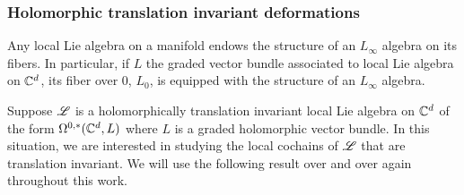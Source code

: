 \documentclass[10pt]{amsart}
\def\brian{\textcolor{blue}{BW: }\textcolor{blue}}
\begin{document}
%

\subsubsection{Holomorphic translation invariant deformations}

Any local Lie algebra on a manifold endows the structure of an $L_\infty$ algebra on its fibers. 
In particular, if $L$ the graded vector bundle associated to local Lie algebra on $\mathbb C^d$, its fiber over $0$, $L_0$, is equipped with the structure of an $L_\infty$ algebra. 

Suppose $\mathscr L$ is a holomorphically translation invariant local Lie algebra on $\mathbb C^d$ of the form $\Omega^{0,*}(\mathbb C^d, L)$ where $L$ is a graded holomorphic vector bundle.
In this situation, we are interested in studying the local cochains of $\mathscr L$ that are translation invariant.
We will use the following result over and over again throughout this work.

\end{document}
